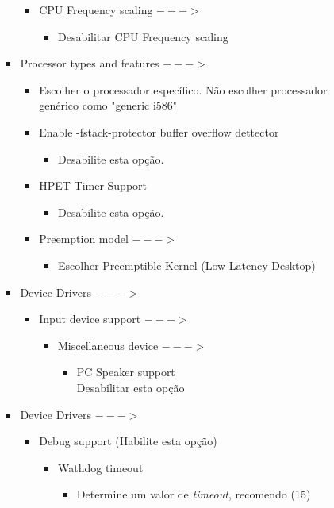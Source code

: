 \documentclass[a4paper,10pt]{article}
\begin{document}
\begin{enumerate}
\begin{enumerate}
\begin{itemize}
\begin{itemize}
		  \item CPU Frequency scaling $--->$
		    \begin{itemize}
		      \item Desabilitar CPU Frequency scaling
		    \end{itemize}

		\end{itemize}

	      \item Processor types and features $--->$
		\begin{itemize}
		\item Escolher o processador específico. Não escolher processador genérico como "generic i586"
		\item Enable -fstack-protector buffer overflow dettector
		  \begin{itemize}
		  \item Desabilite esta opção.
		  \end{itemize}

		\item HPET Timer Support
		  \begin{itemize}
		    \item Desabilite esta opção.
		  \end{itemize}

		\item Preemption model $--->$
		  \begin{itemize}
		  \item Escolher Preemptible Kernel (Low-Latency Desktop)
		  \end{itemize}
		\end{itemize}
	      
	      \item Device Drivers $--->$
		\begin{itemize}
		\item Input device support $--->$
		  \begin{itemize}
		  \item Miscellaneous device $--->$
		    \begin{itemize}
		    \item PC Speaker support\\
		      Desabilitar esta opção
		    \end{itemize}
		  \end{itemize}
		\end{itemize}

	      \item Device Drivers $--->$
		\begin{itemize}
		  \item Debug support (Habilite esta opção)
		    \begin{itemize}
		      \item Wathdog timeout
			\begin{itemize}
			 \item Determine um valor de \emph{timeout}, recomendo (15)
			\end{itemize}


\end{itemize}
\end{itemize}
\end{itemize}
\end{enumerate}
\end{enumerate}
\end{document}
